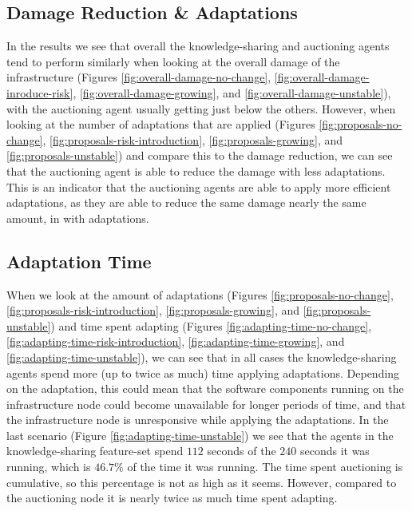\subsection{Damage Reduction \& Adaptations}
\label{ssec:efficient-adaptations}
In the results we see that overall the knowledge-sharing and auctioning agents tend to perform similarly when looking at the overall damage of the infrastructure (Figures \ref{fig:overall-damage-no-change}, \ref{fig:overall-damage-inroduce-risk}, \ref{fig:overall-damage-growing}, and \ref{fig:overall-damage-unstable}), with the auctioning agent usually getting just below the others. However, when looking at the number of adaptations that are applied (Figures \ref{fig:proposals-no-change}, \ref{fig:proposals-risk-introduction}, \ref{fig:proposals-growing}, and \ref{fig:proposals-unstable}) and compare this to the damage reduction, we can see that the auctioning agent is able to reduce the damage with less adaptations. This is an indicator that the auctioning agents are able to apply more efficient adaptations, as they are able to reduce the same damage nearly the same amount, in with adaptations.

\subsection{Adaptation Time}
\label{ssec:adaptation-time}
When we look at the amount of adaptations (Figures \ref{fig:proposals-no-change}, \ref{fig:proposals-risk-introduction}, \ref{fig:proposals-growing}, and \ref{fig:proposals-unstable}) and time spent adapting (Figures \ref{fig:adapting-time-no-change}, \ref{fig:adapting-time-risk-introduction}, \ref{fig:adapting-time-growing}, and \ref{fig:adapting-time-unstable}), we can see that in all cases the knowledge-sharing agents spend more (up to twice as much) time applying adaptations.
Depending on the adaptation, this could mean that the software components running on the infrastructure node could become unavailable for longer periods of time, and that the infrastructure node is unresponsive while applying the adaptations.  In the last scenario (Figure \ref{fig:adapting-time-unstable}) we see that the agents in the knowledge-sharing feature-set spend $112$ seconds of the $240$ seconds it was running, which is $46.7\%$ of the time it was running. The time spent auctioning is cumulative, so this percentage is not as high as it seems. However, compared to the auctioning node it is nearly twice as much time spent adapting.

